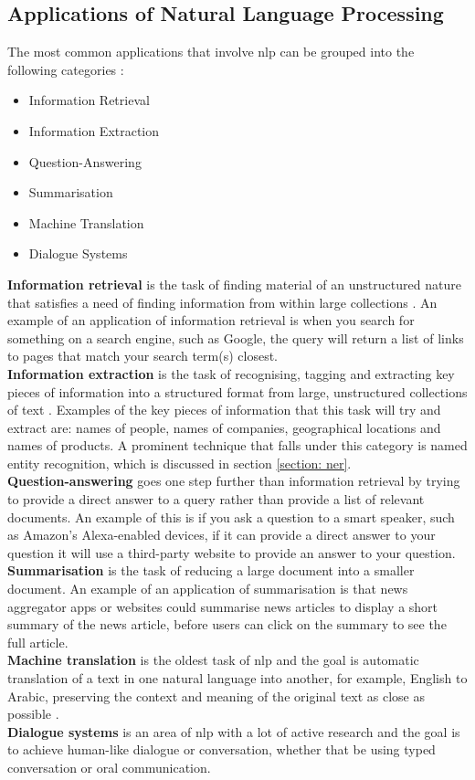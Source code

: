 \subsection{Applications of Natural Language Processing} \label{ssection: nlp-applications}
The most common applications that involve \gls{nlp} can be grouped into the following categories \autocite{liddy2001natural}:
\begin{itemize}
	\item Information Retrieval
	\item Information Extraction
	\item Question-Answering
	\item Summarisation
	\item Machine Translation
	\item Dialogue Systems 
\end{itemize}
\noindent
\textbf{Information retrieval} is the task of finding material of an unstructured nature that satisfies a need of finding information from within large collections \autocite[pp. 1-4]{info-retrieval2018}. An example of an application of information retrieval is when you search for something on a search engine, such as Google, the query will return a list of links to pages that match your search term(s) closest.\\
\textbf{Information extraction} is the task of recognising, tagging and extracting key pieces of information into a structured format from large, unstructured collections of text \autocite{liddy2001natural}. Examples of the key pieces of information that this task will try and extract are: names of people, names of companies, geographical locations and names of products. A prominent technique that falls under this category is named entity recognition, which is discussed in section \ref{section: ner}.\\
\textbf{Question-answering} goes one step further than information retrieval by trying to provide a direct answer to a query rather than provide a list of relevant documents. An example of this is if you ask a question to a smart speaker, such as Amazon's Alexa-enabled devices, if it can provide a direct answer to your question it will use a third-party website to provide an answer to your question.\\
\textbf{Summarisation} is the task of reducing a large document into a smaller document. An example of an application of summarisation is that news aggregator apps or websites could summarise news articles to display a short summary of the news article, before users can click on the summary to see the full article.\\
\textbf{Machine translation} is the oldest task of \gls{nlp} and the goal is automatic translation of a text in one natural language into another, for example, English to Arabic, preserving the context and meaning of the original text as close as possible \autocite{stanford-nlp-mt}.\\
\textbf{Dialogue systems} is an area of \gls{nlp} with a lot of active research and the goal is to achieve human-like dialogue or conversation, whether that be using typed conversation or oral communication. 

